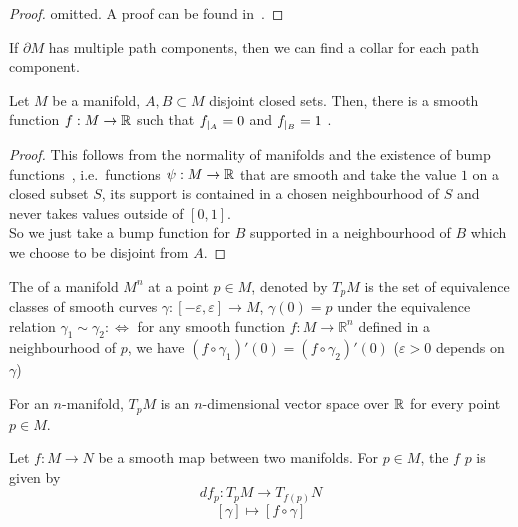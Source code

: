 \documentclass[a4paper,12pt]{article}
\begin{document}
\begin{proof}
    omitted. A proof can be found in\ \cite[p.223]{lee}.
\end{proof}

\begin{observation}
    If \(\partial M\) has multiple path components, then we can find a collar for each path component.
\end{observation}

\begin{theorem}\label{urysohn}
    Let \(M\) be a manifold, \(A,B\subset M\) disjoint closed sets. Then, there is a smooth function \(f:M\to\mathbb{R}\) such that \(f_{|_{A}}=0\) and \(f_{|_{B}}=1\)
.
\end{theorem}

\begin{proof}
    This follows from the normality of manifolds and the existence of bump functions\ \cite[Proposition 2.25]{lee}, i.e.\ functions \(\psi:M\to\mathbb{R}\) that are smooth and take the value \(1\) on a closed subset \(S\), its support is contained in a chosen neighbourhood of \(S\) and never takes values outside of \([0,1]\).\\
    So we just take a bump function for \(B\) supported in a neighbourhood of \(B\) which we choose to be disjoint from \(A\).
\end{proof}

\begin{definition}
    The  of a manifold \(M^n\) at a point \(p\in M\), denoted by \(T_p M\) is the set of equivalence classes of smooth curves \(\gamma:[-\varepsilon,\varepsilon]\to M\), \(\gamma(0)=p\) under the equivalence relation \(\gamma_1\sim\gamma_2:\Leftrightarrow\) for any smooth function \(f:M\to\mathbb{R}^n\) defined in a neighbourhood of \(p\), we have \((f\circ\gamma_1)'(0)=(f\circ\gamma_2)'(0)\) (\(\varepsilon>0\) depends on \(\gamma\))
\end{definition}

\begin{remark}\cite[Proposition 3.10]{lee}
    For an \(n\)-manifold, \(T_p M\) is an \(n\)-dimensional vector space over \(\mathbb{R}\) for every point \(p\in M\).
\end{remark}

\begin{definition}
    Let \(f:M\to N\) be a smooth map between two manifolds. For \(p\in M\), the  \(f\)  \(p\) is given by
    \[df_p:T_p M\to T_{f(p)}N\]
    \[[\gamma]\mapsto[f\circ \gamma]\]
\end{definition}
\end{document}
